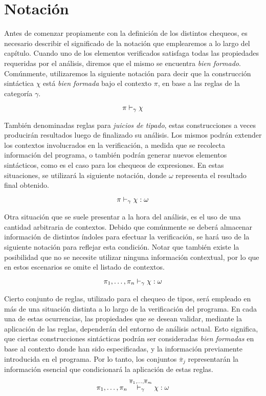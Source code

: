 \section{Notación}

Antes de comenzar propiamente con la definición de los distintos chequeos, es necesario describir el significado de la notación que emplearemos a lo largo del capítulo.
Cuando uno de los elementos verificados satisfaga todas las propiedades requeridas por el análisis, diremos que el mismo se encuentra \textit{bien formado}.
Comúnmente, utilizaremos la siguiente notación para decir que la construcción sintáctica $\chi$ está \textit{bien formada} bajo el contexto $\pi$, en base a las reglas de la categoría $\gamma$.
\begin{gather*}
\pi \DASH{\gamma} \chi
\end{gather*}

También denominadas reglas para \textit{juicios de tipado}, estas construcciones a veces producirán resultados luego de finalizado su análisis.
Los mismos podrán extender los contextos involucrados en la verificación, a medida que se recolecta información del programa, o también podrán generar nuevos elementos sintácticos, como es el caso para los chequeos de expresiones.
En estas situaciones, se utilizará la siguiente notación, donde $\omega$ representa el resultado final obtenido.
\begin{gather*}
\pi \DASH{\gamma} \chi : \omega
\end{gather*}

Otra situación que se suele presentar a la hora del análisis, es el uso de una cantidad arbitraria de contextos.
Debido que comúnmente se deberá almacenar información de distintos índoles para efectuar la verificación, se hará uso de la siguiente notación para reflejar esta condición.
Notar que también existe la posibilidad que no se necesite utilizar ninguna información contextual, por lo que en estos escenarios se omite el listado de contextos.
\begin{gather*}
\pi_1, \ldots, \pi_n \DASH{\gamma} \chi : \omega
\end{gather*}

Cierto conjunto de reglas, utilizado para el chequeo de tipos, será empleado en más de una situación distinta a lo largo de la verificación del programa.
En cada una de estas ocurrencias, las propiedades que se desean validar, mediante la aplicación de las reglas, dependerán del entorno de análisis actual.
Esto significa, que ciertas construcciones sintácticas podrán ser consideradas \textit{bien formadas} en base al contexto donde han sido especificadas, y la información previamente introducida en el programa.
Por lo tanto, los conjuntos $\overline{\pi}_{j}$ representarán la información esencial que condicionará la aplicación de estas reglas.
\begin{gather*}
\pi_1, \ldots, \pi_n \DASH[\overline{\pi}_{1}, \ldots, \overline{\pi}_{m}]{\gamma} \chi : \omega
\end{gather*}

